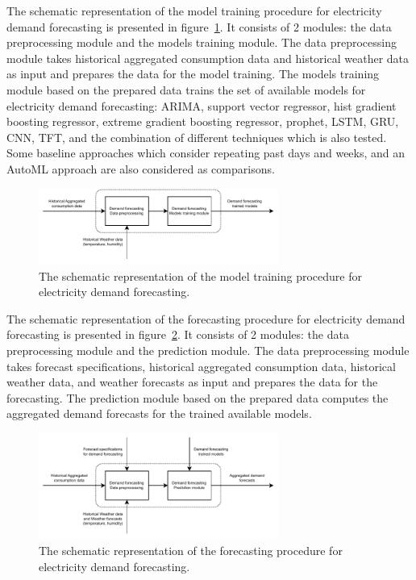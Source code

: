 The schematic representation of the model training procedure for electricity demand forecasting is presented in figure~\ref{fig:modeltrainingdemand}.
It consists of 2 modules: the data preprocessing module and the models training module.
The data preprocessing module takes historical aggregated consumption data and historical weather data as input and prepares the data for the model training.
The models training module based on the prepared data trains the set of available models for electricity demand forecasting: ARIMA, support vector regressor, hist gradient boosting regressor, extreme gradient boosting regressor, prophet, LSTM, GRU, CNN, TFT, and the combination of different techniques which is also tested.
Some baseline approaches which consider repeating past days and weeks, and an AutoML approach are also considered as comparisons.

\begin{figure}[H]
\centering
\includegraphics[width=0.7\textwidth]{images/system_model_training_demand}
\caption{The schematic representation of the model training procedure for electricity demand forecasting.}
\label{fig:modeltrainingdemand}
\end{figure}

The schematic representation of the forecasting procedure for electricity demand forecasting is presented in figure~\ref{fig:modelforecastingdemand}.
It consists of 2 modules: the data preprocessing module and the prediction module.
The data preprocessing module takes forecast specifications, historical aggregated consumption data, historical weather data, and weather forecasts as input and prepares the data for the forecasting.
The prediction module based on the prepared data computes the aggregated demand forecasts for the trained available models.

\begin{figure}[H]
\centering
\includegraphics[width=0.7\textwidth]{images/system_model_forecasting_demand}
\caption{The schematic representation of the forecasting procedure for electricity demand forecasting.}
\label{fig:modelforecastingdemand}
\end{figure}



